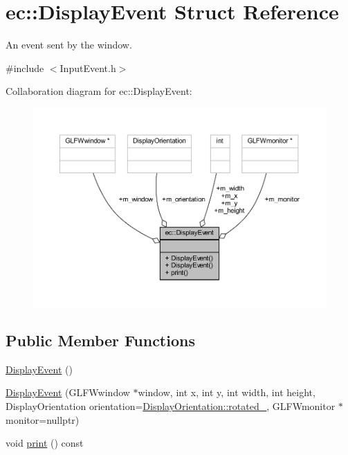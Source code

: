 \hypertarget{structec_1_1_display_event}{}\section{ec\+:\+:Display\+Event Struct Reference}
\label{structec_1_1_display_event}


An event sent by the window.  




{\ttfamily \#include $<$Input\+Event.\+h$>$}



Collaboration diagram for ec\+:\+:Display\+Event\+:\nopagebreak
\begin{figure}[H]
\begin{center}
\leavevmode
\includegraphics[width=350pt]{structec_1_1_display_event__coll__graph}
\end{center}
\end{figure}
\subsection*{Public Member Functions}
\begin{DoxyCompactItemize}
\item 
\mbox{\hyperlink{structec_1_1_display_event_a34ed8f096607ab02657e3599cd3d3211}{Display\+Event}} ()
\item 
\mbox{\hyperlink{structec_1_1_display_event_aa3ba57a1a866569e66bf13aa77d06bee}{Display\+Event}} (G\+L\+F\+Wwindow $\ast$window, int x, int y, int width, int height, Display\+Orientation orientation=\mbox{\hyperlink{_input_event_8h_a69ce17c829030355847d745e3ca3b9f3}{Display\+Orientation\+::rotated\+\_}}, G\+L\+F\+Wmonitor $\ast$monitor=nullptr)
\item 
void \mbox{\hyperlink{structec_1_1_display_event_a5e6bc91b25bc5fe6ffa8197f2fed32c2}{print}} () const
\end{DoxyCompactItemize}
